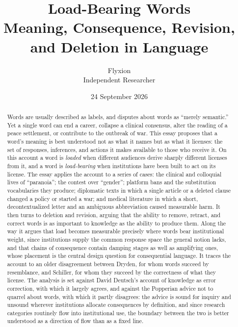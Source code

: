 \documentclass[11pt,a4paper]{article}
\title{\textbf{Load-Bearing Words}\\[0.4em]
\large Meaning, Consequence, Revision, and Deletion in Language}
\author{Flyxion\\ \small Independent Researcher}
\date{24 September 2026}
\theoremstyle{plain}
\theoremstyle{definition}
\theoremstyle{remark}
\begin{document}
\maketitle

\begin{abstract}
\noindent
Words are usually described as labels, and disputes about words as ``merely semantic.'' Yet a single word can end a career, collapse a clinical consensus, alter the reading of a peace settlement, or contribute to the outbreak of war. This essay proposes that a word's meaning is best understood not as what it names but as what it licenses: the set of responses, inferences, and actions it makes available to those who receive it. On this account a word is \emph{loaded} when different audiences derive sharply different licenses from it, and a word is \emph{load-bearing} when institutions have been built to act on its license. The essay applies the account to a series of cases: the clinical and colloquial lives of ``paranoia''; the contest over ``gender''; platform bans and the substitution vocabularies they produce; diplomatic texts in which a single article or a deleted clause changed a policy or started a war; and medical literature in which a short, decontextualized letter and an ambiguous abbreviation caused measurable harm. It then turns to deletion and revision, arguing that the ability to remove, retract, and correct words is as important to knowledge as the ability to produce them. Along the way it argues that load becomes measurable precisely where words bear institutional weight, since institutions supply the common response space the general notion lacks, and that chains of consequence contain damping stages as well as amplifying ones, whose placement is the central design question for consequential language. It traces the account to an older disagreement between Dryden, for whom words succeed by resemblance, and Schiller, for whom they succeed by the correctness of what they license. The analysis is set against David Deutsch's account of knowledge as error correction, with which it largely agrees, and against the Popperian advice not to quarrel about words, with which it partly disagrees: the advice is sound for inquiry and unsound wherever institutions allocate consequences by definition, and since research categories routinely flow into institutional use, the boundary between the two is better understood as a direction of flow than as a fixed line.
\end{abstract}
\end{document}
